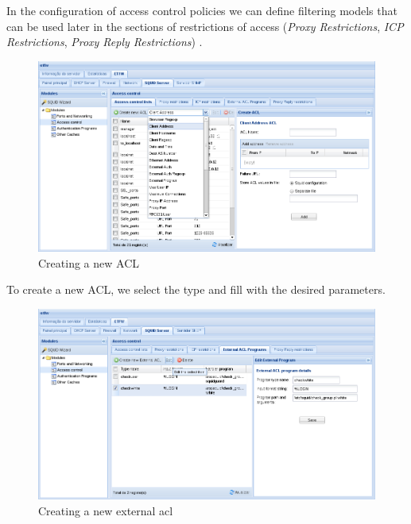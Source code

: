 In the configuration of access control policies we can define filtering models that can be used later in the sections of restrictions of access (\textit{Proxy Restrictions}, \textit{ICP Restrictions}, \textit{Proxy Reply Restrictions}) .

\begin{figure}[H]
    \begin{center}
    \includegraphics[scale=0.38]{screenshots/etfw/etfw_squid_accesscontrol_02.png}
    \caption{Creating a new ACL}
    \label{fig:etfw_squid_accesscontrol_02}
    \end{center}
\end{figure}

To create a new ACL, we select the type and fill with the desired parameters.

\begin{figure}[H]
    \begin{center}
    \includegraphics[scale=0.38]{screenshots/etfw/etfw_squid_accesscontrol_03.png}
    \caption{Creating a new external acl}
    \label{fig:etfw_squid_accesscontrol_03}
    \end{center}
\end{figure}

